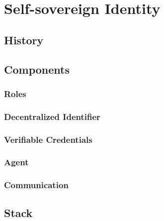 
\chapter{Self-sovereign Identity}\label{chapter: ssi}	
	\section{History}
	\section{Components}
	\subsection{Roles}
	\subsection{Decentralized Identifier}
	\subsection{Verifiable Credentials}
	\subsection{Agent}
	\subsection{Communication}
	\section{Stack}